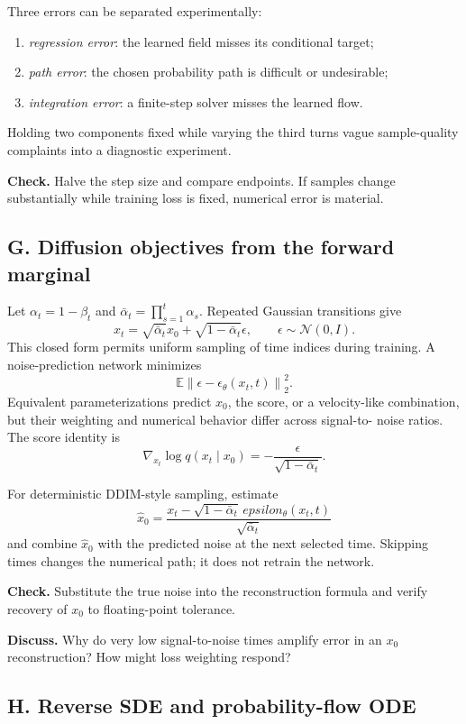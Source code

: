 \documentclass[11pt]{article}
\newcommand{\E}{\mathbb{E}}
\begin{document}
Three errors can be separated experimentally:
\begin{enumerate}
\item \emph{regression error}: the learned field misses its conditional target;
\item \emph{path error}: the chosen probability path is difficult or undesirable;
\item \emph{integration error}: a finite-step solver misses the learned flow.
\end{enumerate}
Holding two components fixed while varying the third turns vague sample-quality
complaints into a diagnostic experiment.

\textbf{Check.} Halve the step size and compare endpoints. If samples change
substantially while training loss is fixed, numerical error is material.

\subsection*{G. Diffusion objectives from the forward marginal}

Let $\alpha_t=1-\beta_t$ and
$\bar\alpha_t=\prod_{s=1}^t\alpha_s$. Repeated Gaussian transitions give
\[
 x_t=\sqrt{\bar\alpha_t}x_0+\sqrt{1-\bar\alpha_t}\epsilon,
 \qquad \epsilon\sim\mathcal N(0,I).
\]
This closed form permits uniform sampling of time indices during training. A
noise-prediction network minimizes
\[
 \E\left\|\epsilon-\epsilon_\theta(x_t,t)\right\|_2^2.
\]
Equivalent parameterizations predict $x_0$, the score, or a velocity-like
combination, but their weighting and numerical behavior differ across signal-to-
noise ratios. The score identity is
\[
 \nabla_{x_t}\log q(x_t\mid x_0)
 =-\frac{\epsilon}{\sqrt{1-\bar\alpha_t}}.
\]

For deterministic DDIM-style sampling, estimate
\[
 \hat x_0=\frac{x_t-\sqrt{1-\bar\alpha_t}\,epsilon_\theta(x_t,t)}
 {\sqrt{\bar\alpha_t}}
\]
and combine $\hat x_0$ with the predicted noise at the next selected time. Skipping
times changes the numerical path; it does not retrain the network.

\textbf{Check.} Substitute the true noise into the reconstruction formula and
verify recovery of $x_0$ to floating-point tolerance.

\textbf{Discuss.} Why do very low signal-to-noise times amplify error in an
$x_0$ reconstruction? How might loss weighting respond?

\subsection*{H. Reverse SDE and probability-flow ODE}
\end{document}
